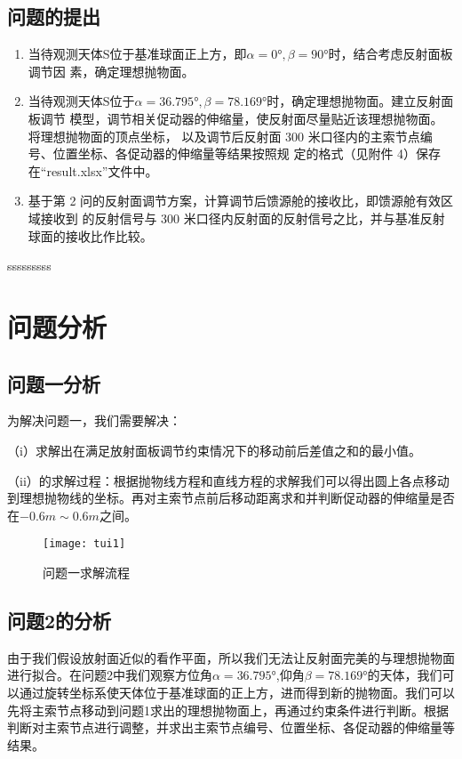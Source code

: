\documentclass[withoutpreface,bwprint]{cumcmthesis} %
\numberwithin{equation}{subsection}
\begin{document}
\subsection{问题的提出}




\begin{enumerate}[label=(\arabic*)]
\item  当待观测天体S位于基准球面正上方，即$\alpha = 0°, \beta = 90°$时，结合考虑反射面板调节因
素，确定理想抛物面。
	
\item  当待观测天体S位于$\alpha = 36.795°, \beta = 78.169°$时，确定理想抛物面。建立反射面板调节
模型，调节相关促动器的伸缩量，使反射面尽量贴近该理想抛物面。将理想抛物面的顶点坐标，
以及调节后反射面 300 米口径内的主索节点编号、位置坐标、各促动器的伸缩量等结果按照规
定的格式（见附件 4）保存在“result.xlsx”文件中。
	
\item  基于第 2 问的反射面调节方案，计算调节后馈源舱的接收比，即馈源舱有效区域接收到
的反射信号与 300 米口径内反射面的反射信号之比，并与基准反射球面的接收比作比较。
	
\end{enumerate}


sssssssss

\section{问题分析}
\subsection{问题一分析}
为解决问题一，我们需要解决：

（i）求解出在满足放射面板调节约束情况下的移动前后差值之和的最小值。

（ii）的求解过程：根据抛物线方程和直线方程的求解我们可以得出圆上各点移动到理想抛物线的坐标。再对主索节点前后移动距离求和并判断促动器的伸缩量是否在$-0.6m\sim0.6m$之间。


\begin{figure}[!h]
    \centering
    \texttt{[image: tui1]}
    \caption{问题一求解流程}
    \label{fig:1}
\end{figure}


\subsection{问题2的分析}
由于我们假设放射面近似的看作平面，所以我们无法让反射面完美的与理想抛物面进行拟合。在问题2中我们观察方位角$\alpha = 36.795°$,仰角$ \beta = 78.169°$的天体，我们可以通过旋转坐标系使天体位于基准球面的正上方，进而得到新的抛物面。我们可以先将主索节点移动到问题1求出的理想抛物面上，再通过约束条件进行判断。根据判断对主索节点进行调整，并求出主索节点编号、位置坐标、各促动器的伸缩量等结果。
\end{document}
